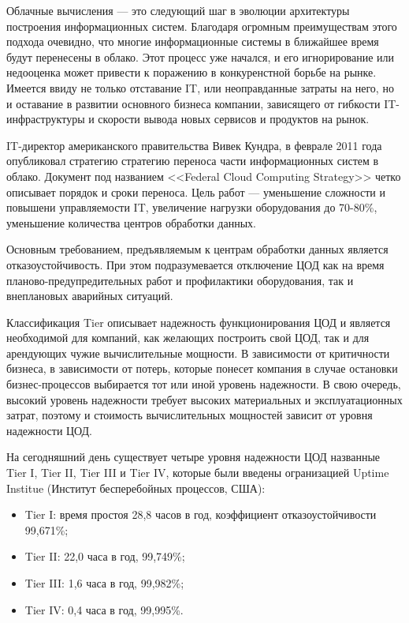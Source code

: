 Облачные вычисления --- это следующий шаг в эволюции архитектуры построения информационных систем.
Благодаря огромным преимуществам этого подхода очевидно, что многие информационные системы в ближайшее время будут перенесены в облако.
Этот процесс уже начался, и его игнорирование или недооценка может привести к поражению в конкуренстной борьбе на рынке.
Имеется ввиду не только отставание IT, или неоправданные затраты на него, но и оставание в развитии основного бизнеса компании, зависящего от гибкости IT-инфраструктуры и скорости вывода новых сервисов и продуктов на рынок.

IT-директор американского правительства Вивек Кундра, в феврале 2011 года опубликовал стратегию стратегию переноса части информационных систем в облако.
Документ под названием <<Federal Cloud Computing Strategy>> четко описывает порядок и сроки переноса. 
Цель работ --- уменьшение сложности и повышени управляемости IT, увеличение нагрузки оборудования до 70-80\%, уменьшение количества центров обработки данных.

Основным требованием, предъявляемым к центрам обработки данных является отказоустойчивость.
При этом подразумевается отключение ЦОД как на время планово-предупредительных работ и профилактики оборудования, так и внеплановых аварийных ситуаций.

Классификация Tier описывает надежность функционирования ЦОД и является необходимой для компаний, как желающих построить свой ЦОД, так и для арендующих чужие вычислительные мощности.
В зависимости от критичности бизнеса, в зависимости от потерь, которые понесет компания в случае остановки бизнес-процессов выбирается тот или иной уровень надежности.
В свою очередь, высокий уровень надежности требует высоких материальных и эксплуатационных затрат, поэтому и стоимость вычислительных мощностей зависит от уровня надежности ЦОД. \cite{dc-tier}

На сегодняшний день существует четыре уровня надежности ЦОД названные Tier I, Tier II, Tier III и Tier IV, которые были введены огранизацией Uptime Institue (Институт бесперебойных процессов, США):
\begin{itemize}
  \item Tier I: время простоя 28,8 часов в год, коэффициент отказоустойчивости 99,671\%;
  \item Tier II: 22,0 часа в год, 99,749\%;
  \item Tier III: 1,6 часа в год, 99,982\%;
  \item Tier IV: 0,4 часа в год, 99,995\%.
\end{itemize}

